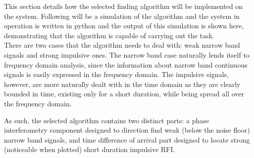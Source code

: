 This section details how the selected finding algorithm will be implemented on the system. Following will be a simulation of the algorithm and the system in operation is written in python and the output of this simulation is shown here, demonstrating that the algorithm is capable of carrying out the task.\\

There are two cases that the algorithm needs to deal with: weak narrow band signals and strong impulsive ones. The narrow band case naturally lends itself to frequency domain analysis, since the information about narrow band continuous signals is easily expressed in the frequency domain. The impulsive signals, however, are more naturally dealt with in the time domain as they are clearly bounded in time, existing only for a short duration, while being spread all over the frequency domain. 

As such, the selected algorithm contains two distinct parts: a phase interferometry component designed to direction find weak (below the noise floor) narrow band signals, and time difference of arrival part designed to locate strong (noticeable when plotted) short duration impulsive RFI.


